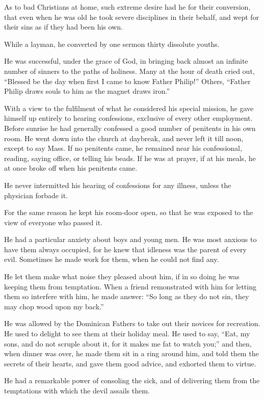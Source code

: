 As to bad Christians at home,
such extreme desire had he for their conversion, that even when he was
old he took severe disciplines in their behalf, and wept for their sins
as if they had been his own.

While a layman, he converted by
one sermon thirty dissolute youths.

He was successful, under the
grace of God, in bringing back almost an infinite number of sinners to
the paths of holiness. Many at the hour of death cried out, ``Blessed be
the day when first I came to know Father Philip!'' Others, ``Father Philip
draws souls to him as the magnet draws iron.''

With a view to the fulfilment of
what he considered his special mission, he gave himself up entirely to
hearing confessions, exclusive of every other employment. Before sunrise
he had generally confessed a good number of penitents in his own room.
He went down into the church at daybreak, and never left it till noon,
except to say Mass. If no penitents came, he remained near his
confessional, reading, saying office, or telling his beads. If he was at
prayer, if at his meals, he at once broke off when his penitents came.

He never intermitted his hearing
of confessions for any illness, unless the physician forbade it.

For the same reason he kept his
room-door open, so that he was exposed to the view of everyone who
passed it.

He had a particular anxiety
about boys and young men. He was most anxious to have them always
occupied, for he knew that idleness was the parent of every evil.
Sometimes he made work for them, when he could not find any.

He let them make what noise they
pleased about him, if in so doing he was keeping them from temptation.
When a friend remonstrated with him for letting them so interfere with
him, he made answer: ``So long as they do not sin, they may chop wood
upon my back.''

He was allowed by the Dominican
Fathers to take out their novices for recreation. He used to delight to
see them at their holiday meal. He used to say, ``Eat, my sons, and do
not scruple about it, for it makes me fat to watch you;'' and then, when
dinner was over, he made them sit in a ring around him, and told
them the secrets of their hearts, and gave them good advice, and
exhorted them to virtue.

He had a remarkable power of
consoling the sick, and of delivering them from the temptations with
which the devil assails them.

